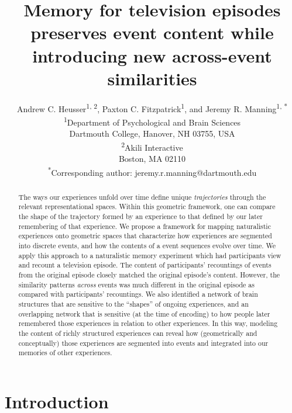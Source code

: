 \documentclass{article}
\title{Memory for television episodes preserves event content while introducing new across-event similarities}
\author{Andrew C. Heusser\textsuperscript{1, 2}, Paxton C. Fitzpatrick\textsuperscript{1}, and Jeremy R. Manning\textsuperscript{1, *}\\\textsuperscript{1}Department of Psychological and Brain Sciences\\Dartmouth College, Hanover, NH 03755, USA\\\textsuperscript{2}Akili Interactive\\Boston, MA 02110\\\textsuperscript{*}Corresponding author: jeremy.r.manning@dartmouth.edu}
\begin{document}
\maketitle

\begin{abstract}
The ways our experiences unfold over time define unique \textit{trajectories} through the relevant representational spaces.  Within this geometric framework, one can compare the shape of the trajectory formed by an experience to that defined by our later remembering of that experience.  We propose a framework for mapping naturalistic experiences onto geometric spaces that characterize how experiences are segmented into discrete events, and how the contents of a event sequences evolve over time.  We apply this approach to a naturalistic memory experiment which had participants view and recount a television episode.  The content of participants' recountings of events from the original episode closely matched the original episode's content.  However, the similarity patterns \textit{across} events was much different in the original episode as compared with participants' recountings. We also identified a network of brain structures that are sensitive to the ``shapes'' of ongoing experiences, and an overlapping network that is sensitive (at the time of encoding) to how people later remembered those experiences in relation to other experiences.  In this way, modeling the content of richly structured experiences can reveal how (geometrically and conceptually) those experiences are segmented into events and integrated into our memories of other experiences.
\end{abstract}


\section*{Introduction}
\end{document}
